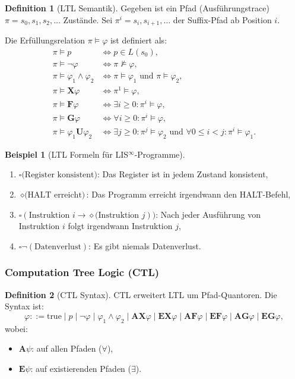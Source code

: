 \documentclass[a4paper,12pt]{article}
\theoremstyle{definition}
\newtheorem{definition}{Definition}
\newtheorem{beispiel}{Beispiel}
\begin{document}
\begin{definition}[LTL Semantik]
	\label{def:ltl_semantik}
	Gegeben ist ein Pfad (Ausführungstrace) $\pi = s_0, s_1, s_2, \ldots$ Zustände. Sei $\pi^i = s_i, s_{i+1}, \ldots$ der Suffix-Pfad ab Position $i$.
	
	Die Erfüllungsrelation $\pi \models \varphi$ ist definiert als:
	\begin{align}
		\pi \models p &\iff p \in L(s_0), \\
		\pi \models \neg\varphi &\iff \pi \not\models \varphi, \\
		\pi \models \varphi_1 \land \varphi_2 &\iff \pi \models \varphi_1 \text{ und } \pi \models \varphi_2, \\
		\pi \models \mathbf{X}\varphi &\iff \pi^1 \models \varphi, \\
		\pi \models \mathbf{F}\varphi &\iff \exists i \geq 0: \pi^i \models \varphi, \\
		\pi \models \mathbf{G}\varphi &\iff \forall i \geq 0: \pi^i \models \varphi, \\
		\pi \models \varphi_1 \mathbf{U} \varphi_2 &\iff \exists j \geq 0: \pi^j \models \varphi_2 \text{ und } \forall 0 \leq i < j: \pi^i \models \varphi_1.
	\end{align}
\end{definition}

\begin{beispiel}[LTL Formeln für LIS$^{\infty}$-Programme]
	\label{bsp:ltl_lis_unendlich}
	\begin{enumerate}
		\item $\square \text{(Register konsistent)}$: Das Register ist in jedem Zustand konsistent,
		\item $\diamond \text{(HALT erreicht)}$: Das Programm erreicht irgendwann den HALT-Befehl,
		\item $\square (\text{Instruktion } i \to \diamond \text{(Instruktion } j))$: Nach jeder Ausführung von Instruktion $i$ folgt irgendwann Instruktion $j$,
		\item $\square \neg(\text{Datenverlust})$: Es gibt niemals Datenverlust.
	\end{enumerate}
\end{beispiel}

\subsubsection{Computation Tree Logic (CTL)}

\begin{definition}[CTL Syntax]
	\label{def:ctl_syntax}
	CTL erweitert LTL um Pfad-Quantoren. Die Syntax ist:
	\[
	\varphi ::= \text{true} \mid p \mid \neg \varphi \mid \varphi_1 \land \varphi_2 \mid \mathbf{AX}\varphi \mid \mathbf{EX}\varphi \mid \mathbf{AF}\varphi \mid \mathbf{EF}\varphi \mid \mathbf{AG}\varphi \mid \mathbf{EG}\varphi,
	\]
	wobei:
	\begin{itemize}
		\item $\mathbf{A}\psi$: auf allen Pfaden ($\forall$),
		\item $\mathbf{E}\psi$: auf existierenden Pfaden ($\exists$).
	\end{itemize}
\end{definition}
\end{document}
